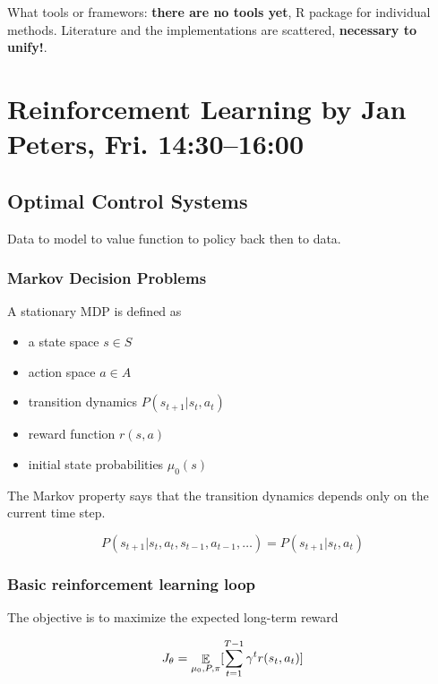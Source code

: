 \documentclass[b5paper]{report}
\begin{document}
What tools or framewors: \textbf{there are no tools yet}, R package for
individual methods. Literature and the implementations are scattered,
\textbf{necessary to unify!}.

\chapter{Reinforcement Learning by Jan Peters, Fri. 14:30--16:00}

\section{Optimal Control Systems}

Data to model to value function to policy back then to data.

\subsection{Markov Decision Problems}

A stationary MDP is defined as

\begin{itemize}
  \item a state space $s \in S$
  \item action space $a \in A$
  \item transition dynamics $P(s_{t+1}| s_t, a_t)$
  \item reward function $r(s,a)$
  \item initial state probabilities $\mu_0(s)$
\end{itemize}

The Markov property says that the transition dynamics depends only on the
current time step.

\begin{equation}
  P(s_{t+1}|s_t, a_t, s_{t-1}, a_{t-1}, \dots) = P(s_{t+1}|s_t, a_t)
\end{equation}


\subsection{Basic reinforcement learning loop}

The objective is to maximize the expected long-term reward

\begin{equation}
  J_\theta = \operatorname*{\mathbb{\mathop{E}}}_{\mu_0, P, \pi} [\sum_{t=1}^{T-1}\gamma^t r(s_t, a_t)]
\end{equation}
\end{document}

